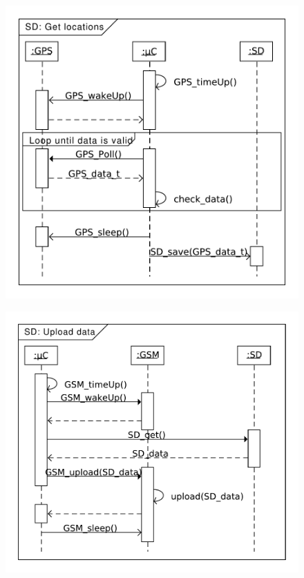 \begin{figure}
	\centering
	\includegraphics[width=0.7\linewidth]{gfx/Design/SD_getLocation.pdf}
	\caption{}
	\label{fig:SD:getlocation}
\end{figure}

\begin{figure}
	\centering
	\includegraphics[width=0.7\linewidth]{gfx/Design/SD_Upload.pdf}
	\caption{}
	\label{fig:SD:upload}
\end{figure}



\FloatBarrier